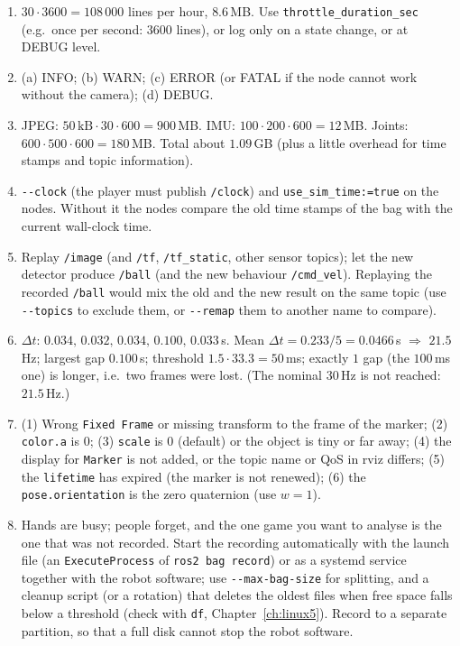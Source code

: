 \begin{enumerate}[label=\textbf{\ansnum.\arabic*}]
  \item $30\cdot3600=108\,000$ lines per hour, $8.6$\,MB. Use \verb!throttle_duration_sec! (e.g.\ once per second: $3600$ lines), or log only on a state change, or at DEBUG level.
  \item (a) INFO; (b) WARN; (c) ERROR (or FATAL if the node cannot work without the camera); (d) DEBUG.
  \item JPEG: $50\,\text{kB}\cdot30\cdot600=900$\,MB. IMU: $100\cdot200\cdot600=12$\,MB. Joints: $600\cdot500\cdot600=180$\,MB. Total about $1.09$\,GB (plus a little overhead for time stamps and topic information).
  \item \verb!--clock! (the player must publish \verb!/clock!) and \verb!use_sim_time:=true! on the nodes. Without it the nodes compare the old time stamps of the bag with the current wall-clock time.
  \item Replay \verb!/image! (and \verb!/tf!, \verb!/tf_static!, other sensor topics); let the new detector produce \verb!/ball! (and the new behaviour \verb!/cmd_vel!). Replaying the recorded \verb!/ball! would mix the old and the new result on the same topic (use \verb!--topics! to exclude them, or \verb!--remap! them to another name to compare).
  \item $\Delta t$: $0.034,\,0.032,\,0.034,\,0.100,\,0.033$\,s. Mean $\Delta t=0.233/5=0.0466$\,s $\Rightarrow$ $21.5$\,Hz; largest gap $0.100$\,s; threshold $1.5\cdot33.3=50$\,ms; exactly $1$ gap (the $100$\,ms one) is longer, i.e.\ two frames were lost. (The nominal $30$\,Hz is not reached: $21.5$\,Hz.)
  \item (1) Wrong \verb!Fixed Frame! or missing transform to the frame of the marker; (2) \verb!color.a! is $0$; (3) \verb!scale! is $0$ (default) or the object is tiny or far away; (4) the display for \verb!Marker! is not added, or the topic name or QoS in rviz differs; (5) the \verb!lifetime! has expired (the marker is not renewed); (6) the \verb!pose.orientation! is the zero quaternion (use $w=1$).
  \item Hands are busy; people forget, and the one game you want to analyse is the one that was not recorded. Start the recording automatically with the launch file (an \verb!ExecuteProcess! of \verb!ros2 bag record!) or as a systemd service together with the robot software; use \verb!--max-bag-size! for splitting, and a cleanup script (or a rotation) that deletes the oldest files when free space falls below a threshold (check with \verb!df!, Chapter~\ref{ch:linux5}). Record to a separate partition, so that a full disk cannot stop the robot software.

\end{enumerate}
